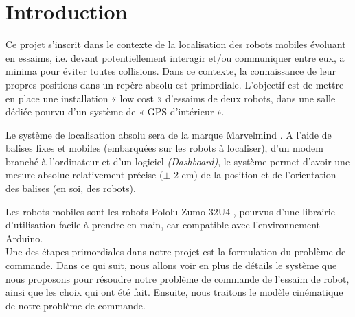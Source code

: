 \section{Introduction}

Ce projet s’inscrit dans le contexte de la localisation des robots mobiles évoluant en essaims, i.e. devant potentiellement interagir et/ou communiquer entre eux, a minima pour éviter toutes collisions. Dans ce contexte, la connaissance de leur propres positions dans un repère absolu est primordiale. L’objectif est de mettre en place une installation « low cost » d’essaims de deux robots, dans une salle dédiée pourvu d’un système de « GPS d’intérieur ». 

\noindent Le système de localisation absolu sera de la marque Marvelmind \cite{marvelmind-url}. A l’aide de balises fixes et mobiles (embarquées sur les robots à localiser), d'un modem branché à l'ordinateur et d'un logiciel \textit{(Dashboard)}, le système permet d’avoir une mesure absolue relativement précise ($\pm$ 2 cm) de la position et de l’orientation des balises (en soi, des robots). 

\noindent Les robots mobiles sont les robots Pololu Zumo 32U4 \cite{pololu-url},  pourvus d’une librairie d’utilisation facile à prendre en main, car compatible avec l’environnement Arduino. \\[1pt]


Une des étapes primordiales dans notre projet est la formulation du problème de commande. Dans ce qui suit, nous allons voir en plus de détails le système que nous proposons pour résoudre notre problème de commande de l'essaim de robot, ainsi que les choix qui ont été fait. Ensuite, nous traitons le modèle cinématique de notre problème de commande. 